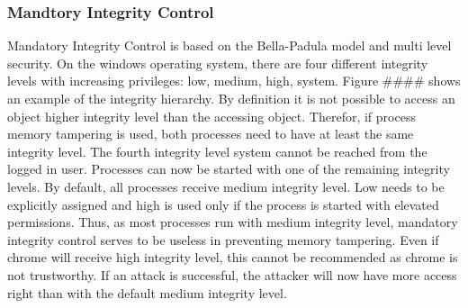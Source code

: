 \subsubsection{Mandtory Integrity Control}
Mandatory Integrity Control is based on the Bella-Padula model and multi level security. On the windows operating system, there are four different integrity levels with increasing privileges: low, medium, high, system. Figure \#\#\#\# shows an example of the integrity hierarchy. By definition it is not possible to access an object higher integrity level than the accessing object. Therefor, if process memory tampering is used, both processes need to have at least the same integrity level. The fourth integrity level system cannot be reached from the logged in user. Processes can now be started with one of the remaining integrity levels. By default, all processes receive medium integrity level. Low needs to be explicitly assigned and high is used only if the process is started with elevated permissions. Thus, as most processes run with medium integrity level, mandatory integrity control serves to be useless in preventing memory tampering. Even if chrome will receive high integrity level, this cannot be recommended as chrome is not trustworthy. If an attack is successful, the attacker will now have more access right than with the default medium integrity level.